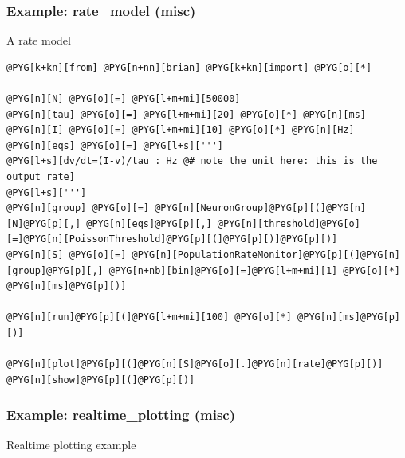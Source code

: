 \documentclass[letterpaper,10pt,english]{manual}
\begin{document}
\resetcurrentobjects
\hypertarget{--doc-examples-misc_rate_model}{}

\hypertarget{index-62}{}\subsubsection{Example: rate\_model (misc)}

A rate model

\begin{Verbatim}[commandchars=@\[\]]
@PYG[k+kn][from] @PYG[n+nn][brian] @PYG[k+kn][import] @PYG[o][*]

@PYG[n][N] @PYG[o][=] @PYG[l+m+mi][50000]
@PYG[n][tau] @PYG[o][=] @PYG[l+m+mi][20] @PYG[o][*] @PYG[n][ms]
@PYG[n][I] @PYG[o][=] @PYG[l+m+mi][10] @PYG[o][*] @PYG[n][Hz]
@PYG[n][eqs] @PYG[o][=] @PYG[l+s][''']
@PYG[l+s][dv/dt=(I-v)/tau : Hz @# note the unit here: this is the output rate]
@PYG[l+s][''']
@PYG[n][group] @PYG[o][=] @PYG[n][NeuronGroup]@PYG[p][(]@PYG[n][N]@PYG[p][,] @PYG[n][eqs]@PYG[p][,] @PYG[n][threshold]@PYG[o][=]@PYG[n][PoissonThreshold]@PYG[p][(]@PYG[p][)]@PYG[p][)]
@PYG[n][S] @PYG[o][=] @PYG[n][PopulationRateMonitor]@PYG[p][(]@PYG[n][group]@PYG[p][,] @PYG[n+nb][bin]@PYG[o][=]@PYG[l+m+mi][1] @PYG[o][*] @PYG[n][ms]@PYG[p][)]

@PYG[n][run]@PYG[p][(]@PYG[l+m+mi][100] @PYG[o][*] @PYG[n][ms]@PYG[p][)]

@PYG[n][plot]@PYG[p][(]@PYG[n][S]@PYG[o][.]@PYG[n][rate]@PYG[p][)]
@PYG[n][show]@PYG[p][(]@PYG[p][)]
\end{Verbatim}

\resetcurrentobjects
\hypertarget{--doc-examples-misc_realtime_plotting}{}

\hypertarget{index-63}{}\subsubsection{Example: realtime\_plotting (misc)}

Realtime plotting example
\end{document}
